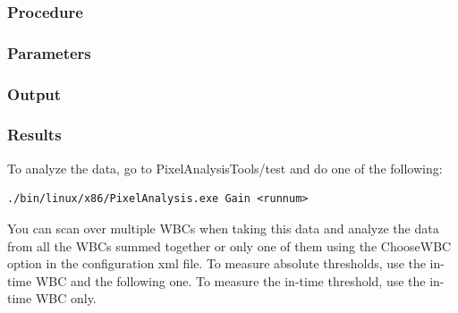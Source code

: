 \subsubsection{Procedure}
\subsubsection{Parameters}
\subsubsection{Output}
\subsubsection{Results}

To analyze the data, go to PixelAnalysisTools/test and do one of the following: 
\begin{verbatim}
./bin/linux/x86/PixelAnalysis.exe Gain <runnum>
\end{verbatim}

You can scan over multiple WBCs when taking this data and analyze the data from all the WBCs summed together or only one of them using the ChooseWBC option in the configuration xml file. To measure absolute thresholds, use the in-time WBC and the following one.  To measure the in-time threshold, use the in-time WBC only.






